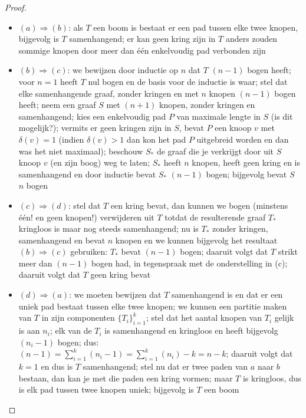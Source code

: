 \begin{proof}
\begin{itemize}
\item $(a) \Rightarrow (b)$: als $T$ een boom is bestaat er een pad
  tussen elke twee knopen, bijgevolg is $T$ samenhangend; er kan geen
  kring zijn in $T$ anders zouden sommige knopen door meer dan
  \'{e}\'{e}n enkelvoudig pad verbonden zijn
\item $(b) \Rightarrow (c)$: we bewijzen door inductie op $n$ dat $T$
  $(n-1)$ bogen heeft; voor $n=1$ heeft $T$ nul bogen en de basis voor de
  inductie is waar; stel dat elke samenhangende graaf, zonder kringen en
  met $n$ knopen $(n-1)$ bogen heeft;
  neem een graaf $S$ met $(n+1)$ knopen, zonder kringen en samenhangend;
  kies een
  enkelvoudig
  pad $P$ van maximale lengte in $S$ (is dit mogelijk?); vermits
  er geen kringen zijn in $S$, bevat $P$ een knoop $v$ met $\delta(v) = 1$
  (indien $\delta(v) > 1$ dan kon het pad $P$ uitgebreid worden en dan
  was het niet maximaal); beschouw $S_{*}$ de graaf die je verkrijgt
  door uit $S$ knoop $v$ (en zijn boog) weg te laten; $S_{*}$ heeft $n$
  knopen, heeft geen kring en is samenhangend en door inductie bevat
  $S_{*}$ $(n-1)$ bogen; bijgevolg bevat $S$ $n$ bogen
\item $(c) \Rightarrow (d)$: stel dat $T$ een kring bevat, dan kunnen we
  bogen (minstens \'{e}\'{e}n! en geen knopen!) verwijderen uit $T$
  totdat de resulterende graaf $T_{*}$ kringloos is maar nog steeds
  samenhangend; nu is $T_{*}$ zonder kringen, samenhangend en bevat $n$
  knopen en we kunnen bijgevolg het resultaat $(b) \Rightarrow (c)$
  gebruiken: $T_{*}$ bevat $(n-1)$ bogen; daaruit volgt dat $T$ strikt
  meer dan $(n-1)$ bogen had, in tegenspraak met de onderstelling in
  (c); daaruit volgt dat $T$ geen kring bevat
\item $(d) \Rightarrow (a)$: we moeten bewijzen dat $T$ samenhangend is
  en dat er een uniek pad bestaat tussen elke twee knopen; we kunnen
  een partitie maken van $T$ in zijn componenten $\{T_{i}\}_{i=1}^{k}$;
  stel dat het aantal knopen van $T_{i}$ gelijk is aan $n_{i}$; elk
  van de $T_{i}$ is samenhangend en kringloos en heeft bijgevolg
  $(n_{i}-1)$ bogen; dus: $(n-1) = \sum_{i=1}^{k} (n_{i}-1) =
  \sum_{i=1}^{k} (n_{i}) - k = n - k$; daaruit volgt dat $k=1$ en dus is
  $T$ samenhangend; stel nu dat er twee paden van $a$ naar $b$ bestaan, 
  dan kan je met die paden een kring vormen;
  maar $T$ is kringloos, dus is elk pad tussen twee knopen uniek;
  bijgevolg is $T$ een boom

\end{itemize}
\end{proof}


